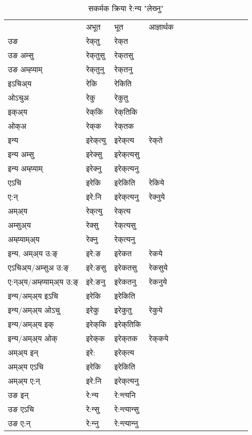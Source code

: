 \begin{table}[H]
\centering
\caption{\label{ekt.vt} सकर्मक क्रिया  रे:न्य  "लेख्‍नु"  }
\begin{tabular}{l|l|l|l|l|l|l|l|l|l|l|l|l}  \toprule
&अभूत & भूत & आज्ञार्थक \\ 
उङ &रेक्‌तु &रेक्‌त \\ 
उङ अम्सु&रेक्‌तुसु &रेक्‌तसु \\ 
उङ अम्ह्‍याम्&रेक्‌तुनु &रेक्‌तनु \\ 
इऽचिअ्य &रेकि &रेकिति   \\ 
ओऽचुअ        &रेकु &रेकुतु   \\ 
इक्अ्य&रेक्‌कि &रेक्‌तिकि   \\ 
ओक्अ &रेक्‌क &रेक्‌तक   \\ 
इन्य & इरेक्‌त्यु  & इरेक्‌त्य &रेक्‌ते  \\ 
इन्य अम्सु& इरेक्सु  & इरेक्‌त्यसु   \\ 
इन्य अम्ह्‍याम्& इरेक्‍नु  & इरेक्‌त्यनु   \\ 
एऽचि & इरेकि & इरेकिति &रेकिये    \\ 
ए:न् & इरे:नि  & इरेक्‌त्यनु &रेक्‍नुये  \\ 
अम्अ्य & रेक्‌त्यु  & रेक्‌त्य  \\ 
अम्सुअ्य & रेक्सु & रेक्‌त्यसु  \\ 
अम्ह्‍याम्अ्य & रेक्‍नु  & रेक्‌त्यनु \\ 
\midrule
इन्य, अम्अ्य उ:ङ्‌ &इरे:ङ &इरेकत &रेकये \\ 
एऽचिअ्य/अम्सुअ उ:ङ्‌ &इरे:ङसु &इरेकतसु &रेकसुये \\ 
ए:न्अ्य/अम्ह्‍याम्अ्य उ:ङ्‌ &इरे:ङनु &इरेकतनु &रेकनुये \\ 
इन्य/अम्अ्य इऽचि &इरेकि &इरेकिति    \\ 
इन्य/अम्अ्य ओऽचु &इरेकु &इरेकुतु  &रेकुये  \\ 
इन्य/अम्अ्य इक् &इरेक्‌कि &इरेक्‌तिकि   \\ 
इन्य/अम्अ्य ओक् &इरेक्‌क &इरेक्‌तक  &रेक्‌कये  \\ 
अम्अ्य इन् & इरे: & इरेक्‌त्य   \\ 
अम्अ्य एऽचि & इरेकि & इरेकिति    \\ 
अम्अ्य ए:न् & इरे:नि  & इरेक्‌त्यनु  \\ 
\midrule
उङ इन् & रे:न्य  & रे:न्त्यनि  \\ 
उङ एऽचि & रे:न्सु  & रे:न्त्यान्सु   \\ 
उङ ए:न्& रे:न्‍नु  & रे:न्त्यान्‍नु   \\ 
\bottomrule
\end{tabular}
\end{table}


